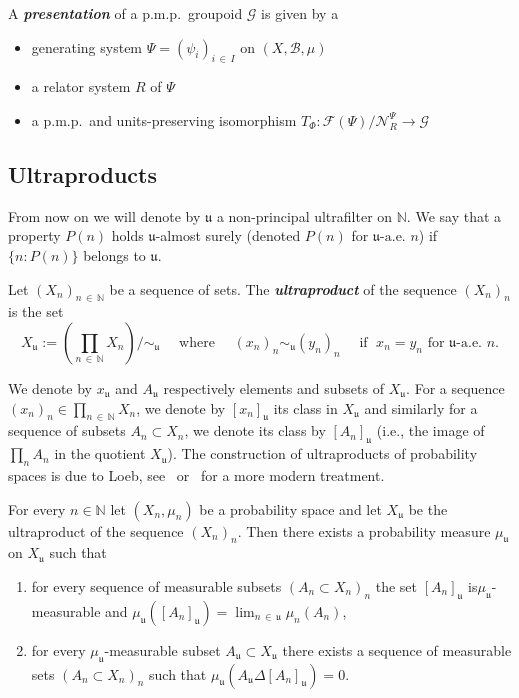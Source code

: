 \documentclass[AHL,Unicode,longabstracts,published]{cedram}
\newcommand{\defin}[1]{\textbf{\emph{#1}}}
\newcommand{\Nmath}{\mathbb{N}}
\newcommand{\cn}{\mathcal{N}}
\newcommand{\cg}{\mathcal{G}}
\newcommand{\cf}{\mathcal{F}}
\newcommand{\rb}{\mathscr{B}}
\newcommand{\ul}{\mathfrak{u}}
\newcommand{\ulae}{\mathfrak{u}\textrm{-a.e. }n}
\newcommand{\pmp}{p.m.p.\ }
\begin{document}
\begin{defi}
A \defin{presentation} of a \pmp groupoid $\cg$ is given by a
\begin{itemize}
\item[--] generating system $\Psi=(\psi_i)_{i\,\in\,I}$ on $(X,\rb, \mu)$
\item[--] a relator system $R$ of $\Psi$
\item[--] a \pmp and units-preserving isomorphism $T_\Phi: \cf(\Psi)/\cn_R^{\Psi}\rightarrow \cg$
\end{itemize}
\end{defi}



\subsection{Ultraproducts}

From now on we will denote by $\ul$ a non-principal ultrafilter on $\Nmath$. We say that a property $P(n)$ holds $\ul$-almost surely (denoted $P(n)$ for $\ulae$) if $\{n : P(n)\}$ belongs to $\ul$.
\begin{defi}
Let $(X_n)_{n\,\in\,\Nmath}$ be a sequence of sets. The
\defin{ultraproduct} of the sequence $(X_n)_n$ is the set
\[
X_\ul:=\left(\prod_{n\,\in\,\Nmath} X_n\right)/\sim_\ul\quad\text{ where }\quad (x_n)_n \sim_\ul (y_n)_n\quad \text{ if }\; x_{n}= y_{n}\text{ for }\ulae.
\]
\end{defi}

We denote by $x_\ul$ and $A_\ul$ respectively elements and subsets of $X_\ul$. For a sequence $(x_n)_n\in \prod_{n\,\in\,\Nmath} X_n$, we denote by $[x_n]_\ul$ its class in $X_\ul$ and similarly for a sequence of subsets $A_n\subset X_n$, we denote its class by $[A_n]_\ul$ (i.e., the image of $\prod_n A_n$ in the quotient $X_\ul$). The construction of ultraproducts of probability spaces is due to Loeb, see~\cite{CKTD} or~\cite{Card-ultra-prod-we-sofic-arxiv} for a more modern treatment.

\begin{theo}\label{thm:ultraproduct_measure_space}
For every $n\in\Nmath$ let $(X_n,\mu_n)$ be a probability space and let $X_\ul$ be the ultraproduct of the sequence $(X_n)_n$. Then there exists a probability measure $\mu_\ul$ on $X_\ul$ such that
\begin{enumerate}
\item \label{theo2.29.1} for every sequence of measurable subsets $(A_n\subset X_n)_n$ the set $[A_n]_\ul$ is\linebreak$\mu_\ul$-measurable and $\mu_\ul([A_n]_\ul)=\lim_{n\,\in\,\ul}\mu_n(A_n)$,
\item\label{item:measurable_subsets_in_ultraproducts}
for every $\mu_\ul$-measurable subset $A_\ul\subset X_\ul$ there exists a sequence of measurable sets $(A_n\subset X_n)_n$ such that $\mu_\ul(A_\ul\Delta [A_n]_\ul)=0$.
\end{enumerate}
\end{theo}
\end{document}
